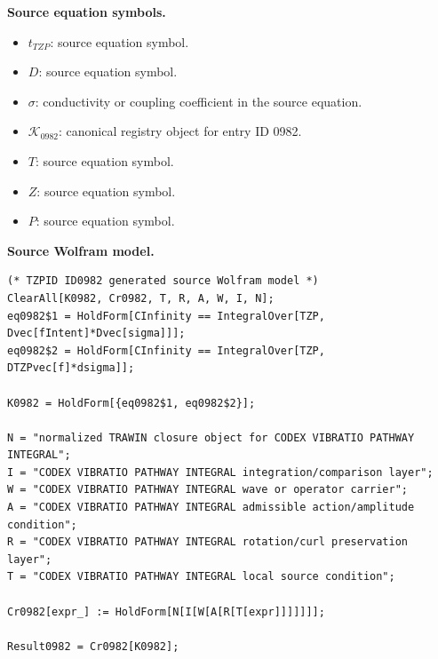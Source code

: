\begin{minipage}[t]{0.49\linewidth}
\begingroup
\small
\raggedright
\textbf{Source equation symbols.}\par
\begin{itemize}[leftmargin=1.35em,itemsep=1pt,topsep=1pt,parsep=0pt]
    \item $t_{TZP}$: source equation symbol.
    \item $D$: source equation symbol.
    \item $\sigma$: conductivity or coupling coefficient in the source equation.
    \item $\mathcal{K}_{0982}$: canonical registry object for entry ID 0982.
    \item $T$: source equation symbol.
    \item $Z$: source equation symbol.
    \item $P$: source equation symbol.
\end{itemize}
\endgroup
\end{minipage}\hfill
\begin{minipage}[t]{0.47\linewidth}
\begingroup
\scriptsize
\raggedright
\textbf{Source Wolfram model.}\par
\begin{Verbatim}[fontsize=\tiny,breaklines=true,breakanywhere=true]
(* TZPID ID0982 generated source Wolfram model *)
ClearAll[K0982, Cr0982, T, R, A, W, I, N];
eq0982$1 = HoldForm[CInfinity == IntegralOver[TZP, Dvec[fIntent]*Dvec[sigma]]];
eq0982$2 = HoldForm[CInfinity == IntegralOver[TZP, DTZPvec[f]*dsigma]];

K0982 = HoldForm[{eq0982$1, eq0982$2}];

N = "normalized TRAWIN closure object for CODEX VIBRATIO PATHWAY INTEGRAL";
I = "CODEX VIBRATIO PATHWAY INTEGRAL integration/comparison layer";
W = "CODEX VIBRATIO PATHWAY INTEGRAL wave or operator carrier";
A = "CODEX VIBRATIO PATHWAY INTEGRAL admissible action/amplitude condition";
R = "CODEX VIBRATIO PATHWAY INTEGRAL rotation/curl preservation layer";
T = "CODEX VIBRATIO PATHWAY INTEGRAL local source condition";

Cr0982[expr_] := HoldForm[N[I[W[A[R[T[expr]]]]]]];

Result0982 = Cr0982[K0982];
\end{Verbatim}
\endgroup
\end{minipage}

